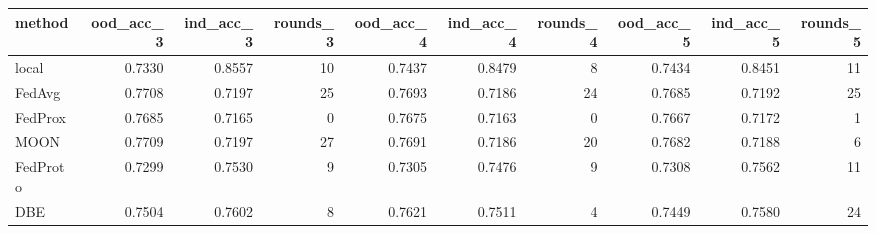 \begin{tabular}{lrrrrrrrrr}
\toprule
method & ood_acc_3 & ind_acc_3 & rounds_3 & ood_acc_4 & ind_acc_4 & rounds_4 & ood_acc_5 & ind_acc_5 & rounds_5 \\
\midrule
local & 0.7330 & 0.8557 & 10 & 0.7437 & 0.8479 & 8 & 0.7434 & 0.8451 & 11 \\
FedAvg & 0.7708 & 0.7197 & 25 & 0.7693 & 0.7186 & 24 & 0.7685 & 0.7192 & 25 \\
FedProx & 0.7685 & 0.7165 & 0 & 0.7675 & 0.7163 & 0 & 0.7667 & 0.7172 & 1 \\
MOON & 0.7709 & 0.7197 & 27 & 0.7691 & 0.7186 & 20 & 0.7682 & 0.7188 & 6 \\
FedProto & 0.7299 & 0.7530 & 9 & 0.7305 & 0.7476 & 9 & 0.7308 & 0.7562 & 11 \\
DBE & 0.7504 & 0.7602 & 8 & 0.7621 & 0.7511 & 4 & 0.7449 & 0.7580 & 24 \\
\bottomrule
\end{tabular}

